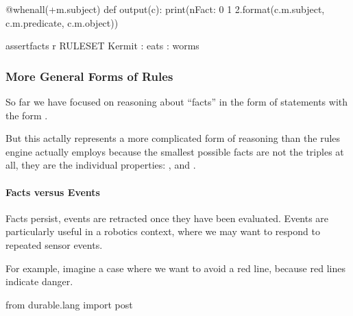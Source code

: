 \documentclass[letterpaper,10pt,english]{sphinxmanual}
\begin{document}
{{\begin{sphinxVerbatim}[commandchars=\\\{\}]
    @when\PYGZus{}all(+m.subject)
    def output(c):
        print(\PYGZsq{}\PYGZbs{}nFact: \PYGZob{}0\PYGZcb{} \PYGZob{}1\PYGZcb{} \PYGZob{}2\PYGZcb{}\PYGZsq{}.format(c.m.subject, c.m.predicate, c.m.object))
\end{sphinxVerbatim}
}

{
\begin{sphinxVerbatim}[commandchars=\\\{\}]
\llap{\color{nbsphinxin}[ ]:\,\hspace{\fboxrule}\hspace{\fboxsep}}\PYGZpc{}\PYGZpc{}assert\PYGZus{}facts \PYGZhy{}r RULESET
Kermit : eats : worms
\end{sphinxVerbatim}
}


\subsubsection{More General Forms of Rules}
\label{\detokenize{content/03_Robot_Lab/Section_00_04:More-General-Forms-of-Rules}}
So far we have focused on reasoning about “facts” in the form of statements with the form .

But this actally represents a more complicated form of reasoning than the rules engine actually employs because the  smallest possible facts are not the  triples at all, they are the individual properties: ,  and .


\paragraph{Facts versus Events}
\label{\detokenize{content/03_Robot_Lab/Section_00_04:Facts-versus-Events}}
Facts persist, events are retracted once they have been evaluated. Events are particularly useful in a robotics context, where we may want to respond to repeated sensor events.

For example, imagine a case where we want to avoid a red line, because red lines indicate danger.

{
\begin{sphinxVerbatim}[commandchars=\\\{\}]
\llap{\color{nbsphinxin}[ ]:\,\hspace{\fboxrule}\hspace{\fboxsep}}from durable.lang import post


\end{sphinxVerbatim}}}
\end{document}
